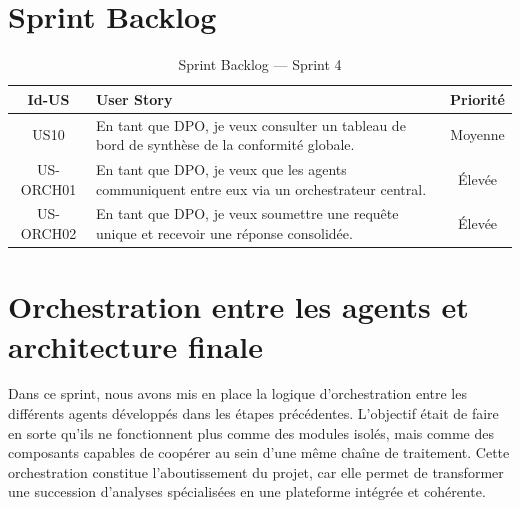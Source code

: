 \documentclass[12pt,a4paper]{report}
\begin{document}
\section{Sprint Backlog}

\begin{table}[H]
\centering
\caption{Sprint Backlog --- Sprint 4}
\label{tab:backlog_sprint4}
\begin{tabularx}{\textwidth}{|c|X|c|}
\hline
\textbf{Id-US} & \textbf{User Story} & \textbf{Priorité} \\
\hline
US10 & En tant que DPO, je veux consulter un tableau de bord de synthèse de la conformité globale. & Moyenne \\
\hline
US-ORCH01 & En tant que DPO, je veux que les agents communiquent entre eux via un orchestrateur central. & Élevée \\
\hline
US-ORCH02 & En tant que DPO, je veux soumettre une requête unique et recevoir une réponse consolidée. & Élevée \\
\hline
\end{tabularx}
\end{table}

\section{Orchestration entre les agents et architecture finale}

Dans ce sprint, nous avons mis en place la logique d'orchestration entre les différents agents développés dans les étapes précédentes. L'objectif était de faire en sorte qu'ils ne fonctionnent plus comme des modules isolés, mais comme des composants capables de coopérer au sein d'une même chaîne de traitement. Cette orchestration constitue l'aboutissement du projet, car elle permet de transformer une succession d'analyses spécialisées en une plateforme intégrée et cohérente.
\end{document}
